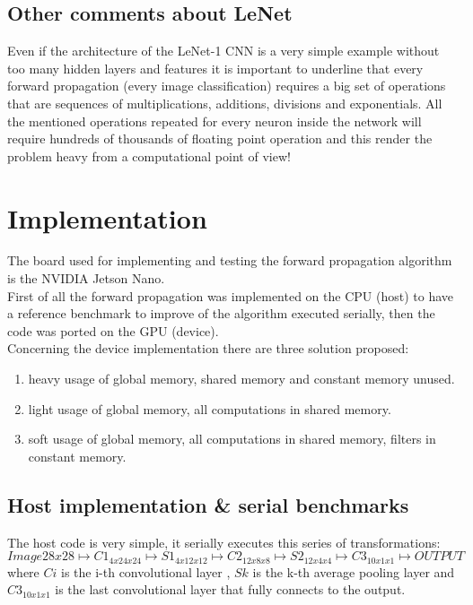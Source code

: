 \documentclass[a4paper]{report}
\begin{document}
\subsection{Other comments about LeNet}
Even if the architecture of the LeNet-1 CNN is a very simple example without too many hidden layers and features it is important to underline that every forward propagation (every image classification) requires a big set of operations that are sequences of multiplications, additions, divisions and exponentials.
All the mentioned operations repeated for every neuron inside the network will require hundreds of thousands of floating point operation and this render the problem heavy from a computational point of view!

\section{Implementation}
The board used for implementing and testing the forward propagation algorithm is the NVIDIA Jetson Nano.\\
First of all the forward propagation was implemented on the CPU (host) to have a reference benchmark to improve of the algorithm executed serially, then the code was ported on the GPU (device).\\
Concerning the device implementation there are three solution proposed:
\begin{enumerate}
\item heavy usage of global memory, shared memory and constant memory unused.
\item light usage of global memory, all computations in shared memory.
\item soft usage of global memory, all computations in shared memory, filters in constant memory.
\end{enumerate}

\subsection{Host implementation \& serial benchmarks}
The host code is very simple, it serially executes this series of transformations:
\[ Image28x28 \mapsto C1_{4x24x24} \mapsto S1_{4x12x12} \mapsto C2_{12x8x8} \mapsto S2_{12x4x4} \mapsto C3_{10x1x1} \mapsto OUTPUT \]
where \(Ci\) is the i-th convolutional layer , \(Sk\) is the k-th average pooling layer and \( C3_{10x1x1} \) is the last convolutional layer that fully connects to the output.\\
\end{document}
